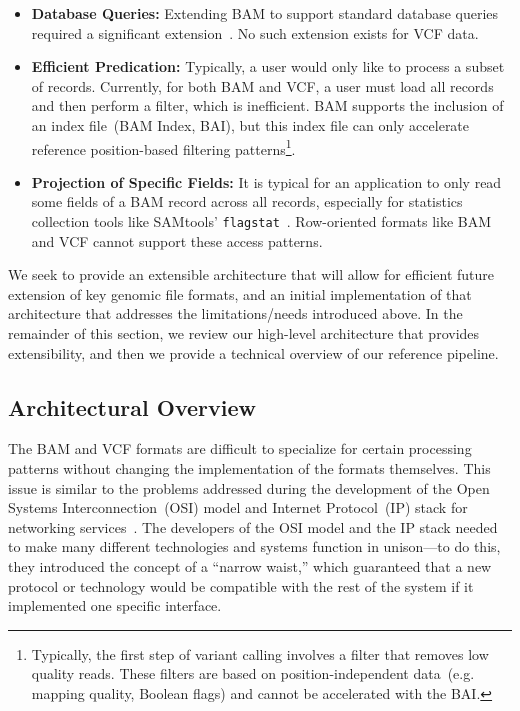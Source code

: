 \documentclass{bioinfo}
\begin{document}
\begin{itemize}
\item \textbf{Database Queries:} Extending BAM to support standard database queries required a significant extension~\citep{kozanitis13}.
No such extension exists for VCF data.
\item \textbf{Efficient Predication:} Typically, a user would only like to process a subset of records. Currently, for both BAM and VCF, a user must load all
records and then perform a filter, which is inefficient. BAM supports the inclusion of an index file~(BAM Index, BAI), but this index file can only accelerate
reference position-based filtering patterns\footnote{Typically, the first step of variant calling involves a filter that removes low quality reads. These filters
are based on position-independent data~(e.g. mapping quality, Boolean flags) and cannot be accelerated with the BAI.}.
\item \textbf{Projection of Specific Fields:} It is typical for an application to only read some fields of a BAM record across all records, especially for
statistics collection tools like SAMtools' \texttt{flagstat}~\citep{li09}. Row-oriented formats like BAM and VCF cannot support these access patterns.
\end{itemize}

We seek to provide an extensible architecture that will allow for efficient future extension of key genomic 
file formats, and an initial implementation of that architecture that addresses the limitations/needs introduced above. In the remainder
of this section, we review our high-level architecture that provides extensibility, and then we provide a technical overview of our reference pipeline.

\subsection{Architectural Overview}
\label{sec:architectural-overview}

The BAM and VCF formats are difficult to specialize for certain processing patterns without
changing the implementation of the formats themselves. This issue is similar to the problems addressed during the development of the Open
Systems Interconnection~(OSI) model and Internet Protocol~(IP) stack for networking services~\citep{zimmermann80}. The developers
of the OSI model and the IP stack needed to make many different technologies and systems function in unison---to do this, they introduced the
concept of a ``narrow waist,'' which guaranteed that a new protocol or technology would be compatible with the rest of the system if it implemented
one specific interface.
\end{document}
